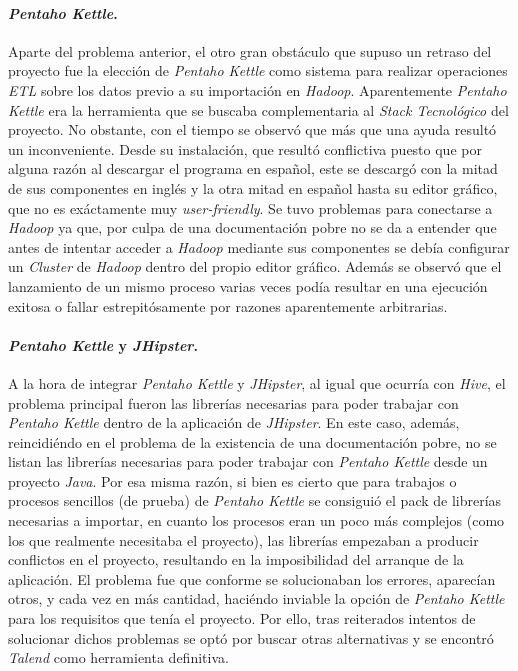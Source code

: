 \paragraph*{\textit{Pentaho Kettle}.} Aparte del problema anterior, el otro gran obstáculo que supuso un retraso del proyecto fue la elección de \textit{Pentaho Kettle} como sistema para realizar operaciones \textit{ETL} sobre los datos previo a su importación en \textit{Hadoop}. Aparentemente \textit{Pentaho Kettle} era la herramienta que se buscaba complementaria al \textit{Stack Tecnológico} del proyecto. No obstante, con el tiempo se observó que más que una ayuda resultó un inconveniente. Desde su instalación, que resultó conflictiva puesto que por alguna razón al descargar el programa en español, este se descargó con la mitad de sus componentes en inglés y la otra mitad en español hasta su editor gráfico, que no es exáctamente muy \textit{user-friendly}. Se tuvo problemas para conectarse a \textit{Hadoop} ya que, por culpa de una documentación pobre no se da a entender que antes de intentar acceder a \textit{Hadoop} mediante sus componentes se debía configurar un \textit{Cluster} de \textit{Hadoop} dentro del propio editor gráfico. Además se observó que el lanzamiento de un mismo proceso varias veces podía resultar en una ejecución exitosa o fallar estrepitósamente por razones aparentemente arbitrarias. 

\paragraph*{\textit{Pentaho Kettle} y \textit{JHipster}.} A la hora de integrar \textit{Pentaho Kettle} y \textit{JHipster}, al igual que ocurría con \textit{Hive}, el problema principal fueron las librerías necesarias para poder trabajar con \textit{Pentaho Kettle} dentro de la aplicación de \textit{JHipster}. En este caso, además, reincidiéndo en el problema de la existencia de una documentación pobre, no se listan las librerías necesarias para poder trabajar con \textit{Pentaho Kettle} desde un proyecto \textit{Java}. Por esa misma razón, si bien es cierto que para trabajos o procesos sencillos (de prueba) de \textit{Pentaho Kettle} se consiguió el pack de librerías necesarias a importar, en cuanto los procesos eran un poco más complejos (como los que realmente necesitaba el proyecto), las librerías empezaban a producir conflictos en el proyecto, resultando en la imposibilidad del arranque de la aplicación. El problema fue que conforme se solucionaban los errores, aparecían otros, y cada vez en más cantidad, haciéndo inviable la opción de \textit{Pentaho Kettle} para los requisitos que tenía el proyecto. Por ello, tras reiterados intentos de solucionar dichos problemas se optó por buscar otras alternativas y se encontró \textit{Talend} como herramienta definitiva.


